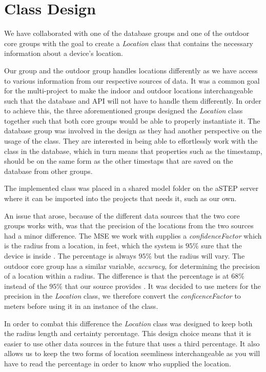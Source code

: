 \section{Class Design}\label{sec:class_design}
We have collaborated with one of the database groups and one of the outdoor core groups with the goal to create a \textit{Location} class that contains the necessary information about a device's location. 

Our group and the outdoor group handles locations differently as we have access to various information from our respective sources of data. It was a common goal for the multi-project to make the indoor and outdoor locations interchangeable such that the database and API will not have to handle them differently. In order to achieve this, the three aforementioned groups designed the \textit{Location} class together such that both core groups would be able to properly instantiate it. The database group was involved in the design as they had another perspective on the usage of the class. They are interested in being able to effortlessly work with the class in the database, which in turn means that properties such as the timestamp, should be on the same form as the other timestaps that are saved on the database from other groups. 

The implemented class was placed in a shared model folder on the aSTEP server %
where it can be imported into the projects that needs it, such as our own. 

An issue that arose, because of the different data sources that the two core groups works with, was that the precision of the locations from the two sources had a minor difference. The MSE we work with supplies a \textit{confidenceFactor} which is the radius from a location, in feet, which the system is $95\%$ sure that the device is inside \cite{MSE_faq}. The percentage is always $95\%$ but the radius will vary. The outdoor core group has a similar variable, \textit{accuracy}, for determining the precision of a location within a radius. The difference is that the percentage is at $68\%$ instead of the $95\%$ that our source provides \cite{android_getAccuracy}. It was decided to use meters for the precision in the \textit{Location} class, we therefore convert the \textit{conficenceFactor} to meters before using it in an instance of the class. 

In order to combat this difference the \textit{Location} class was designed to keep both the radius length and certainty percentage. This design choice means that it is easier to use other data sources in the future that uses a third percentage. It also allows us to keep the two forms of location seemliness interchangeable as you will have to read the percentage in order to know who supplied the location.